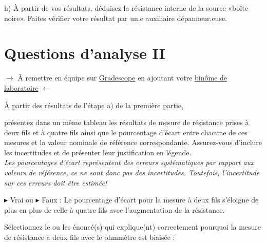 \documentclass[canadien,12pt,oneside,letterpaper]{article}
\begin{document}
h) À partir de vos résultats, déduisez la résistance interne de la source «boîte noire». Faites vérifier votre résultat par un.e auxiliaire dépanneur.euse.


\section{Questions d'analyse II} \label{sec:grade}
\vspace{-0.5cm}
\noindent$\rightarrow$ À remettre en équipe sur \href{https://www.gradescope.com/}{Gradescope} en ajoutant votre \href{https://help.gradescope.com/article/m5qz2xsnjy-student-add-group-members}{binôme de laboratoire} $\leftarrow$

\begin{gradescope}
\item À partir des résultats de l'étape a) de la première partie,
    \begin{gradescope}
    \item présentez dans un même tableau les résultats de mesure de résistance prises à deux fils et à quatre fils ainsi que le pourcentage d'écart entre chacune de ces mesures et la valeur nominale de référence correspondante. Assurez-vous d'inclure les incertitudes et de présenter leur justification en légende.\\\textit{\footnotesize Les pourcentages d'écart représentent des erreurs systématiques par rapport aux valeurs de référence, ce ne sont donc pas des incertitudes. Toutefois, l'incertitude sur ces erreurs doit être estimée!}
    \item $\blacktriangleright$ Vrai ou $\blacktriangleright$ Faux : Le pourcentage d'écart pour la mesure à deux fils s'éloigne de plus en plus de celle à quatre fils avec l'augmentation de la résistance.
    \item Sélectionnez le ou les énoncé(s) qui explique(nt) correctement pourquoi la mesure de résistance à deux fils avec le ohmmètre est biaisée :
        \begin{itemize}[label=$\blacktriangleright$]

\end{itemize}
\end{gradescope}
\end{gradescope}
\end{document}
